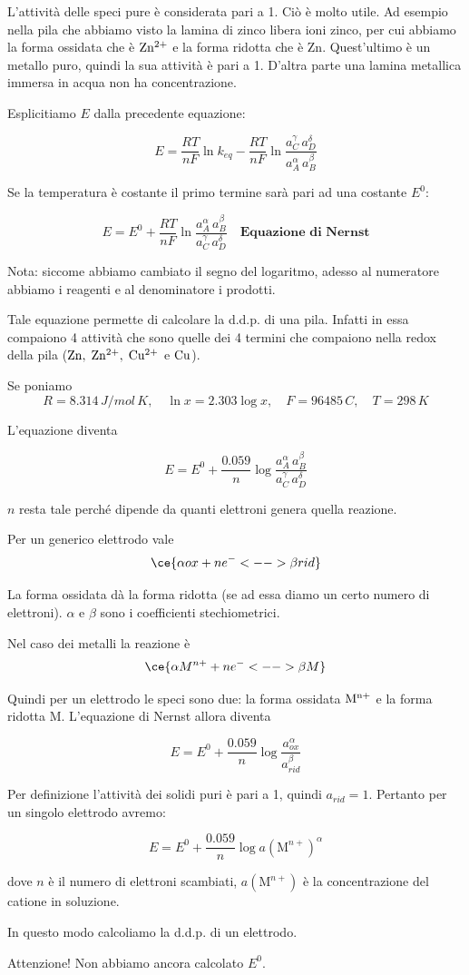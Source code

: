 L'attività delle speci pure è considerata pari a 1. Ciò è molto utile. Ad esempio nella pila che abbiamo visto la lamina di zinco libera ioni zinco, per cui abbiamo la forma ossidata che è $\rm Zn^{2+}$ e la forma ridotta che è Zn. Quest'ultimo è un metallo puro, quindi la sua attività è pari a 1. D'altra parte una lamina metallica immersa in acqua non ha concentrazione.

Esplicitiamo $E$ dalla precedente equazione:

$$E=\frac{RT}{nF}\ln k_{eq} - \frac{RT}{nF}\ln \frac{a_C^{\gamma} \, a_D^{\delta}}{a_A^{\alpha} \, a_B^{\beta}}$$

Se la temperatura è costante il primo termine sarà pari ad una costante $E^0$:

$$E= E^0 + \frac{RT}{nF}\ln \frac{a_A^{\alpha} \, a_B^{\beta}}{a_C^{\gamma} \, a_D^{\delta}} \quad \textbf{Equazione di Nernst}$$

Nota: siccome abbiamo cambiato il segno del logaritmo, adesso al numeratore abbiamo i reagenti e al denominatore i prodotti.

Tale equazione permette di calcolare la d.d.p. di una pila. Infatti in essa compaiono 4 attività che sono quelle dei 4 termini che compaiono nella redox della pila ($\rm Zn, \; Zn^{2+}, \; Cu^{2+}$ e $\rm Cu$).

Se poniamo
$$R=8.314 \, J/mol\,K, \quad \ln x = 2.303 \log x, \quad F=96485 \, C, \quad T=298 \,K$$

L'equazione diventa

$$E = E^0 + \frac{0.059}{n}\log \frac{a_A^{\alpha} \, a_B^{\beta}}{a_C^{\gamma} \, a_D^{\delta}}$$

$n$ resta tale perché dipende da quanti elettroni genera quella reazione.

\vspace{0.2cm}Per un generico elettrodo vale
$$\ce{\alpha ox + ne^- <--> \beta rid}$$

La forma ossidata dà la forma ridotta (se ad essa diamo un certo numero di elettroni). $\alpha$ e $\beta$ sono i coefficienti stechiometrici.

Nel caso dei metalli la reazione è
$$\ce{\alpha M^{n+} + ne^- <--> \beta M}$$

Quindi per un elettrodo le speci sono due: la forma ossidata $\rm M^{n+}$ e la forma ridotta M. L'equazione di Nernst allora diventa

$$E = E^0 + \frac{0.059}{n}\log \frac{a_{ox}^{\alpha}}{a_{rid}^{\beta}}$$

\vspace{0.2cm}Per definizione l'attività dei solidi puri è pari a 1, quindi $a_{rid}=1$. Pertanto per un singolo elettrodo avremo:

$$E = E^0 + \frac{0.059}{n}\log a{(\text{M}^{n+})}^{\alpha}$$

dove $n$ è il numero di elettroni scambiati, $a(\text{M}^{n+})$ è la concentrazione del catione in soluzione.

In questo modo calcoliamo la d.d.p. di un elettrodo.

\vspace{0.2cm}Attenzione! Non abbiamo ancora calcolato $E^0$.
\vfill